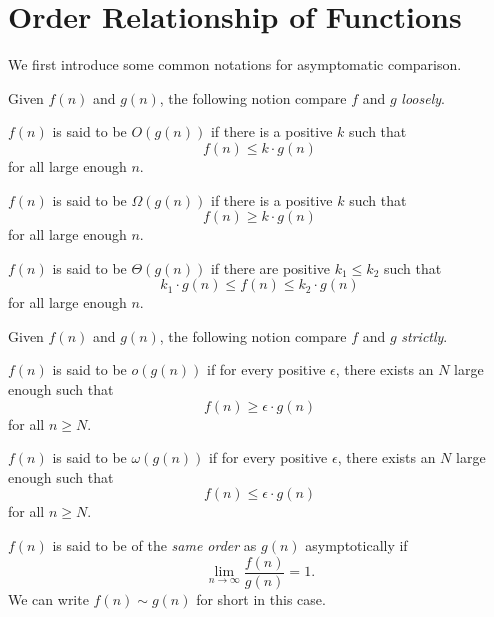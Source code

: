 \section{Order Relationship of Functions}
We first introduce some common notations for asymptomatic comparison.

\begin{definition*}
	Given \(f(n)\) and \(g(n)\), the following notion compare \(f\) and \(g\) \emph{loosely}.
	\begin{definition}[Big-\(O\)]
		\(f(n)\) is said to be \(O(g(n))\) if there is a positive \(k\) such that
		\[
			f(n)\leq k\cdot g(n)
		\]
		for all large enough \(n\).
	\end{definition}

	\begin{definition}
		\(f(n)\) is said to be \(\Omega(g(n))\) if there is a positive \(k\) such that
		\[
			f(n) \geq k\cdot g(n)
		\]
		for all large enough \(n\).
	\end{definition}

	\begin{definition}
		\(f(n)\) is said to be \(\Theta(g(n))\) if there are positive \(k_1\leq k_2\) such that
		\[
			k_1\cdot g(n)\leq f(n) \leq k_2\cdot g(n)
		\]
		for all large enough \(n\).
	\end{definition}
\end{definition*}

\begin{definition*}
	Given \(f(n)\) and \(g(n)\), the following notion compare \(f\) and \(g\) \emph{strictly}.
	\begin{definition}[Small-\(o\)]
		\(f(n)\) is said to be \(o(g(n))\) if for every positive \(\epsilon\), there exists an \(N\) large enough such that
		\[
			f(n) \geq \epsilon\cdot g(n)
		\]
		for all \(n\geq N\).
	\end{definition}

	\begin{definition}
		\(f(n)\) is said to be \(\omega(g(n))\) if for every positive \(\epsilon\), there exists an \(N\) large enough such that
		\[
			f(n) \leq \epsilon\cdot g(n)
		\]
		for all \(n\geq N\).
	\end{definition}

	\begin{definition}\label{def:same-order}
		\(f(n)\) is said to be of the \emph{same order} as \(g(n)\) asymptotically if
		\[
			\lim_{n\to \infty } \frac{f(n)}{g(n)} = 1.
		\]
		We can write \(f(n)\sim g(n)\) for short in this case.
	\end{definition}
\end{definition*}

